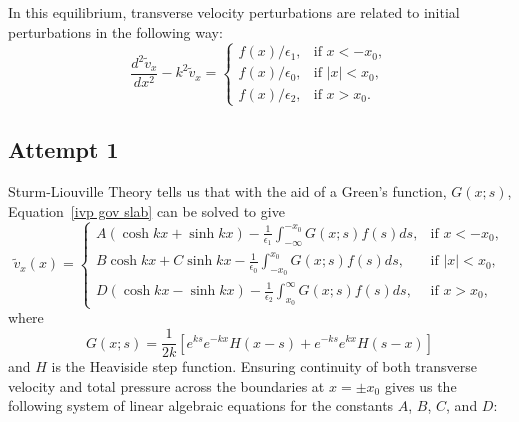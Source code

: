 \documentclass{aastex61}
\begin{document}
In this equilibrium, transverse velocity perturbations are related to initial perturbations in the following way:
\begin{equation}
\frac{d^2\tilde{v}_x}{dx^2} - k^2\tilde{v}_x = 
\begin{cases}
f(x)/\epsilon_1, & \text{if  } x<-x_0,\\
f(x)/\epsilon_0, & \text{if  } |x|<x_0,\\
f(x)/\epsilon_2, & \text{if  } x>x_0.
\end{cases}
\label{ivp gov slab}
\end{equation}


\subsection{Attempt 1}
Sturm-Liouville Theory tells us that with the aid of a Green's function, $G(x;s)$, Equation~\eqref{ivp gov slab} can be solved to give
\begin{equation}
\tilde{v}_x(x) =
\begin{cases}
A(\cosh{kx} + \sinh{kx}) - \frac{1}{\epsilon_1} \int_{-\infty}^{-x_0} G(x;s)f(s)ds, & \text{if  } x<-x_0,\\
B\cosh{kx} + C\sinh{kx} - \frac{1}{\epsilon_0} \int_{-x_0}^{x_0} G(x;s)f(s)ds, & \text{if  } |x|<x_0,\\
D(\cosh{kx} - \sinh{kx}) - \frac{1}{\epsilon_2} \int_{x_0}^{\infty} G(x;s)f(s)ds, & \text{if  } x>x_0,
\end{cases}
\label{ivp slab sol}
\end{equation}
where
\begin{equation}
G(x;s) = \frac{1}{2k}[e^{ks}e^{-kx}H(x-s) + e^{-ks}e^{kx}H(s-x)]
\end{equation}
and $H$ is the Heaviside step function. Ensuring continuity of both transverse velocity and total pressure across the boundaries at $x=\pm x_0$ gives us the following system of linear algebraic equations for the constants $A$, $B$, $C$, and $D$:
\end{document}
